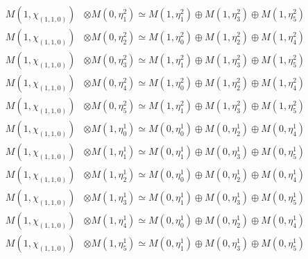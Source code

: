 \begin{align*}
M(1,\chi_{(1,1,0)}) &\otimes M(0,\eta^{2}_{1}) \simeq M(1,\eta^{2}_{1}) \oplus M(1,\eta^{2}_{3}) \oplus M(1,\eta^{2}_{5}) \\
M(1,\chi_{(1,1,0)}) &\otimes M(0,\eta^{2}_{2}) \simeq M(1,\eta^{2}_{0}) \oplus M(1,\eta^{2}_{2}) \oplus M(1,\eta^{2}_{4}) \\
M(1,\chi_{(1,1,0)}) &\otimes M(0,\eta^{2}_{3}) \simeq M(1,\eta^{2}_{1}) \oplus M(1,\eta^{2}_{3}) \oplus M(1,\eta^{2}_{5}) \\
M(1,\chi_{(1,1,0)}) &\otimes M(0,\eta^{2}_{4}) \simeq M(1,\eta^{2}_{0}) \oplus M(1,\eta^{2}_{2}) \oplus M(1,\eta^{2}_{4}) \\
M(1,\chi_{(1,1,0)}) &\otimes M(0,\eta^{2}_{5}) \simeq M(1,\eta^{2}_{1}) \oplus M(1,\eta^{2}_{3}) \oplus M(1,\eta^{2}_{5}) \\
M(1,\chi_{(1,1,0)}) &\otimes M(1,\eta^{1}_{0}) \simeq M(0,\eta^{1}_{0}) \oplus M(0,\eta^{1}_{2}) \oplus M(0,\eta^{1}_{4}) \\
M(1,\chi_{(1,1,0)}) &\otimes M(1,\eta^{1}_{1}) \simeq M(0,\eta^{1}_{1}) \oplus M(0,\eta^{1}_{3}) \oplus M(0,\eta^{1}_{5}) \\
M(1,\chi_{(1,1,0)}) &\otimes M(1,\eta^{1}_{2}) \simeq M(0,\eta^{1}_{0}) \oplus M(0,\eta^{1}_{2}) \oplus M(0,\eta^{1}_{4}) \\
M(1,\chi_{(1,1,0)}) &\otimes M(1,\eta^{1}_{3}) \simeq M(0,\eta^{1}_{1}) \oplus M(0,\eta^{1}_{3}) \oplus M(0,\eta^{1}_{5}) \\
M(1,\chi_{(1,1,0)}) &\otimes M(1,\eta^{1}_{4}) \simeq M(0,\eta^{1}_{0}) \oplus M(0,\eta^{1}_{2}) \oplus M(0,\eta^{1}_{4}) \\
M(1,\chi_{(1,1,0)}) &\otimes M(1,\eta^{1}_{5}) \simeq M(0,\eta^{1}_{1}) \oplus M(0,\eta^{1}_{3}) \oplus M(0,\eta^{1}_{5}) \\
\end{align*}

